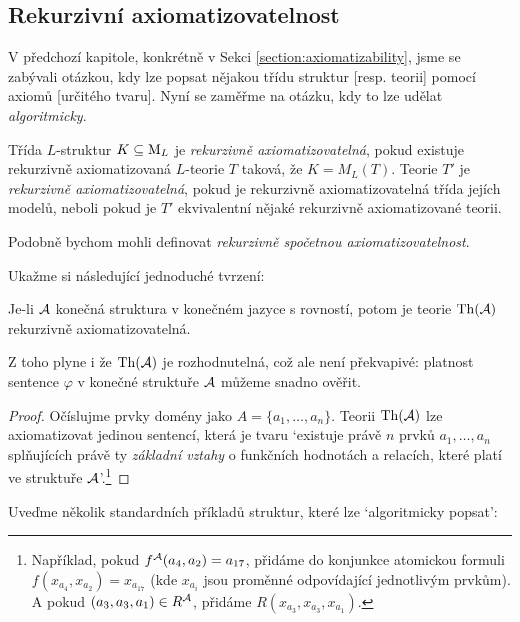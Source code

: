  
\subsection{Rekurzivní axiomatizovatelnost}

V předchozí kapitole, konkrétně v Sekci \ref{section:axiomatizability}, jsme se zabývali otázkou, kdy lze popsat nějakou třídu struktur [resp. teorii] pomocí axiomů [určitého tvaru]. Nyní se zaměřme na otázku, kdy to lze udělat \emph{algoritmicky}.

\begin{definition}
Třída $L$-struktur $K\subseteq\operatorname{M}_L$ je \emph{rekurzivně axiomatizovatelná}, pokud existuje rekurzivně axiomatizovaná $L$-teorie $T$ taková, že $K=M_L(T)$. Teorie $T'$ je \emph{rekurzivně axiomatizovatelná}, pokud je rekurzivně axiomatizovatelná třída jejích modelů, neboli pokud je $T'$ ekvivalentní nějaké rekurzivně axiomatizované teorii.
\end{definition}
\begin{remark}
    Podobně bychom mohli definovat \emph{rekurzivně spočetnou axiomatizovatelnost}.
\end{remark}

Ukažme si následující jednoduché tvrzení:

\begin{proposition}
    Je-li $\mathcal{A}$ konečná struktura v konečném jazyce s rovností, potom je teorie $\operatorname{Th}(\mathcal{A})$ rekurzivně axiomatizovatelná.
\end{proposition}
\begin{remark}
    Z toho plyne i že $\operatorname{Th}(\mathcal{A})$ je rozhodnutelná, což ale není překvapivé: platnost sentence $\varphi$ v konečné struktuře $\mathcal{A}$ můžeme snadno ověřit.
\end{remark}
\begin{proof}
    Očíslujme prvky domény jako $A=\{a_1,\dots,a_n\}$. Teorii $\operatorname{Th}(\mathcal{A})$ lze axiomatizovat jedinou sentencí, která je tvaru `existuje právě $n$ prvků $a_1,\dots,a_n$ splňujících právě ty \emph{základní vztahy} o funkčních hodnotách a relacích, které platí ve struktuře $\mathcal{A}$'.\footnote{Například, pokud $f^{\mathcal{A}}(a_4, a_2)=a_{17}$, přidáme do konjunkce atomickou formuli $f(x_{a_4},x_{a_2})=x_{a_{17}}$ (kde $x_{a_i}$ jsou proměnné odpovídající jednotlivým prvkům). A pokud $(a_3,a_3,a_1)\in R^{\mathcal{A}}$, přidáme $R(x_{a_3},x_{a_3},x_{a_1})$.}    
\end{proof}
 
Uveďme několik standardních příkladů struktur, které lze `algoritmicky popsat':

